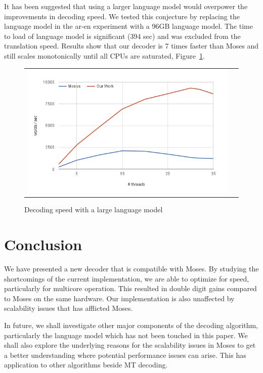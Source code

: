 \documentclass[11pt]{article}
\begin{document}
It has been suggested that using a larger language model would overpower the improvements in decoding speed. We tested this conjecture by replacing the language model in the ar-en experiment with a 96GB language model. The time to load of language model is significant (394 sec) and was excluded from the translation speed. Results show that our decoder is 7 times faster than Moses and still scales monotonically until all CPUs are saturated, Figure~\ref{fig:large-lm}.
\begin{figure}[h]
\centering
\begin{tabular}{cc}
{\includegraphics[scale=0.4]{large-lm.png}} 
\end{tabular}
\caption{Decoding speed with a large language model}
\label{fig:large-lm}
\end{figure} 

\section{Conclusion}

We have presented a new decoder that is compatible with Moses. By studying the shortcomings of the current implementation, we are able to optimize for speed, particularly for multicore operation. This resulted in double digit gains compared to Moses on the same hardware. Our implementation is also unaffected by scalability issues that has afflicted Moses. %

In future, we shall investigate other major components of the decoding algorithm, particularly the language model which has not been touched in this paper. We shall also explore the underlying reasons for the scalability issues in Moses to get a better understanding where potential performance issues can arise. This has application to other algorithms beside MT decoding. 

% 



\end{document}
